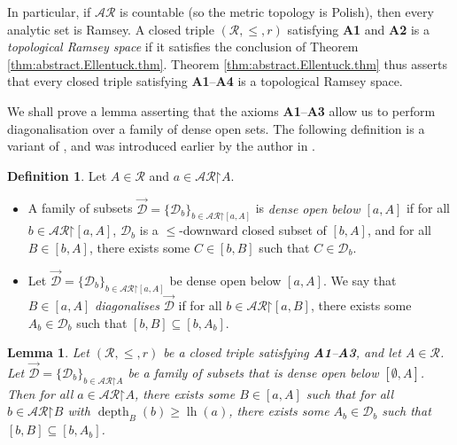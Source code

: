 \documentclass[11pt,reqno]{amsart}
\theoremstyle{plain}
\numberwithin{equation}{section}
\newtheorem{lemma}[theorem]{Lemma}
\theoremstyle{definition}
\newtheorem{definition}[theorem]{Definition}
\newcommand{\func}{\operatorname}
\newcommand{\cal}{\mathcal}
\newcommand{\restrictedto}{\mathord{\upharpoonright}}
\newcommand{\lh}{\func{lh}}
\newcommand{\depth}{\func{depth}}
\newcommand{\D}{\cal{D}}
\begin{document}
In particular, if $\cal{AR}$ is countable (so the metric topology is Polish), then every analytic set is Ramsey. A closed triple $(\cal{R},\leq,r)$ satisfying \textbf{A1} and \textbf{A2} is a \emph{topological Ramsey space} if it satisfies the conclusion of Theorem \ref{thm:abstract.Ellentuck.thm}. Theorem \ref{thm:abstract.Ellentuck.thm} thus asserts that every closed triple satisfying \textbf{A1}--\textbf{A4} is a topological Ramsey space.

We shall prove a lemma asserting that the axioms \textbf{A1}--\textbf{A3} allow us to perform diagonalisation over a family of dense open sets. The following definition is a variant of \cite[Definition 3.6]{DMN15}, and was introduced earlier by the author in \cite{Y24,Y25}.

\begin{definition}
\label{def:dense.open.diagonalisation}
    Let $A \in \cal{R}$ and $a \in \cal{AR}\restrictedto A$.
    \begin{itemize}
        \item A family of subsets $\vec{\D} = \{\D_b\}_{b \in \cal{AR}\restrictedto[a,A]}$ is \emph{dense open below $[a,A]$} if for all $b \in \cal{AR}\restrictedto[a,A]$, $\D_b$ is a $\leq$-downward closed subset of $[b,A]$, and for all $B \in [b,A]$, there exists some $C \in [b,B]$ such that $C \in \D_b$.
        
        \item Let $\vec{\D} = \{\D_b\}_{b \in \cal{AR}\restrictedto[a,A]}$ be dense open below $[a,A]$. We say that $B \in [a,A]$ \emph{diagonalises} $\vec{\D}$ if for all $b \in \cal{AR}\restrictedto[a,B]$, there exists some $A_b \in \D_b$ such that $[b,B] \subseteq [b,A_b]$.
    \end{itemize}
\end{definition}

\begin{lemma}
\label{lem:R.is.semiselective.improved}
    Let $(\cal{R},\leq,r)$ be a closed triple satisfying \textbf{A1}--\textbf{A3}, and let $A \in \cal{R}$. Let $\vec{\D} = \{\D_b\}_{b\in\cal{AR}\restrictedto A}$ be a family of subsets that is dense open below $[\emptyset,A]$. Then for all $a \in \cal{AR}\restrictedto A$, there exists some $B \in [a,A]$ such that for all $b \in \cal{AR}\restrictedto B$ with $\depth_B(b) \geq \lh(a)$, there exists some $A_b \in \D_b$ such that $[b,B] \subseteq [b,A_b]$.
\end{lemma}
\end{document}
